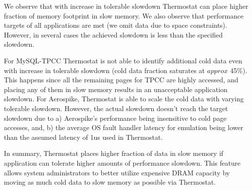 We observe that with increase in tolerable slowdown Thermostat can place higher
fraction of memory footprint in slow memory. We also observe
that performance targets of all applications are met (we omit data due to space
constraints). However, in several cases the achieved slowdown is less than the
specified slowdown.

For MySQL-TPCC Thermostat is not able to identify additional cold data even with
increase in tolerable slowdown (cold data fraction saturates at $approx$ 45\%).
This happens since all the remaining pages for TPCC are highly accessed, and
placing any of them in slow memory results in an unacceptable application
slowdown.
For Aerospike, Thermostat is able to scale the cold data
with varying tolerable slowdown. However, the actual slowdown doesn't reach the
target slowdown due to a) Aerospike's performance being insensitive to cold page
accesses, and, b) the average OS fault handler latency for emulation being lower
than the assumed latency of 1us used in Thermostat.

In summary, Thermostat places higher fraction of data in slow memory if
application can tolerate higher amounts of performance slowdown. This feature
allows system administrators to better utilize expensive DRAM capacity by moving
as much cold data to slow memory as possible via Thermostat.

